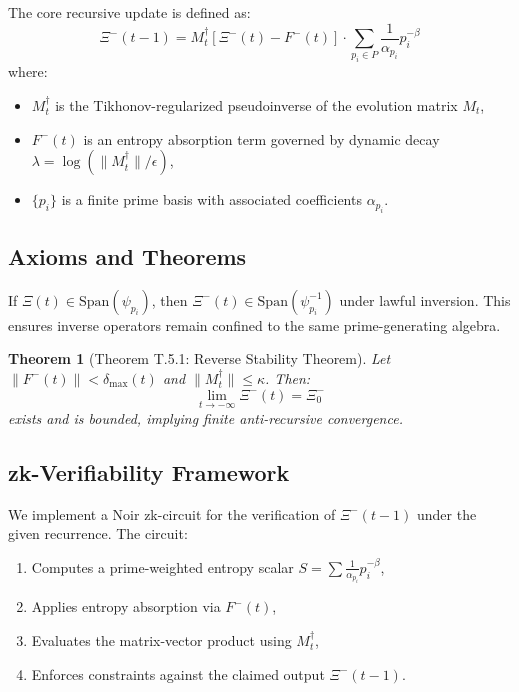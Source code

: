 \documentclass[12]{amsart}
\theoremstyle{plain}
\newtheorem{theorem}{Theorem}[section]
\begin{document}
The core recursive update is defined as:
\begin{equation}
    \Xi^{-}(t-1) = M_t^{\dagger} \left[\Xi^{-}(t) - F^{-}(t)\right] \cdot \sum_{p_i \in P} \frac{1}{\alpha_{p_i}} p_i^{-\beta}
\end{equation}
where:
\begin{itemize}
    \item $M_t^{\dagger}$ is the Tikhonov-regularized pseudoinverse of the evolution matrix $M_t$,
    \item $F^{-}(t)$ is an entropy absorption term governed by dynamic decay $\lambda = \log(\|M_t^{\dagger}\|/\epsilon)$,
    \item $\{p_i\}$ is a finite prime basis with associated coefficients $\alpha_{p_i}$.
\end{itemize}

\subsection{Axioms and Theorems}

\begin{axiom}
If $\Xi(t) \in \mathrm{Span}(\psi_{p_i})$, then $\Xi^{-}(t) \in \mathrm{Span}(\psi_{p_i}^{-1})$ under lawful inversion. This ensures inverse operators remain confined to the same prime-generating algebra.
\end{axiom}

\begin{theorem}[Theorem T.5.1: Reverse Stability Theorem]
Let $\|F^{-}(t)\| < \delta_{\max}(t)$ and $\|M_t^{\dagger}\| \leq \kappa$. Then:
\[
\lim_{t \to -\infty} \Xi^{-}(t) = \Xi^{-}_0
\]
exists and is bounded, implying finite anti-recursive convergence.
\end{theorem}

\subsection{zk-Verifiability Framework}

We implement a Noir zk-circuit for the verification of $\Xi^{-}(t-1)$ under the given recurrence. The circuit:
\begin{enumerate}
    \item Computes a prime-weighted entropy scalar $S = \sum \frac{1}{\alpha_{p_i}} p_i^{-\beta}$,
    \item Applies entropy absorption via $F^{-}(t)$,
    \item Evaluates the matrix-vector product using $M_t^{\dagger}$,
    \item Enforces constraints against the claimed output $\Xi^{-}(t-1)$.
\end{enumerate}
\end{document}
